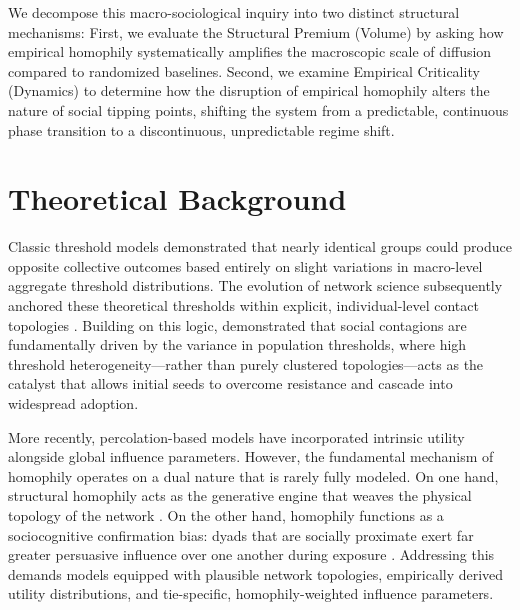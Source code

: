 \documentclass[5p,twocolumn,authoryear]{elsarticle}
\begin{document}
We decompose this macro-sociological inquiry into two distinct structural mechanisms: First, we evaluate the Structural Premium (Volume) by asking how empirical homophily systematically amplifies the macroscopic scale of diffusion compared to randomized baselines. Second, we examine Empirical Criticality (Dynamics) to determine how the disruption of empirical homophily alters the nature of social tipping points, shifting the system from a predictable, continuous phase transition to a discontinuous, unpredictable regime shift.

\section{Theoretical Background}

Classic threshold models \citep{granovetter1978} demonstrated that nearly identical groups could produce opposite collective outcomes based entirely on slight variations in macro-level aggregate threshold distributions. The evolution of network science subsequently anchored these theoretical thresholds within explicit, individual-level contact topologies \citep{valente1995, valente1996, valente2024}. Building on this logic, \citet{valente2020} demonstrated that social contagions are fundamentally driven by the variance in population thresholds, where high threshold heterogeneity---rather than purely clustered topologies---acts as the catalyst that allows initial seeds to overcome resistance and cascade into widespread adoption.

More recently, percolation-based models \citep{tur2018, tur2024} have incorporated intrinsic utility alongside global influence parameters. However, the fundamental mechanism of homophily operates on a dual nature that is rarely fully modeled. On one hand, structural homophily acts as the generative engine that weaves the physical topology of the network \citep{talaga2020}. On the other hand, homophily functions as a sociocognitive confirmation bias: dyads that are socially proximate exert far greater persuasive influence over one another during exposure \citep{centola2011, state2015}. Addressing this demands models equipped with plausible network topologies, empirically derived utility distributions, and tie-specific, homophily-weighted influence parameters.

\end{document}
